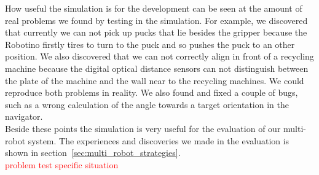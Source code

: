 How useful the simulation is for the development can be seen at the amount of real problems we found by testing in the simulation. For example, we discovered that currently we can not pick up pucks that lie besides the gripper because the Robotino firstly tires to turn to the puck and so pushes the puck to an other position. We also discovered that we can not correctly align in front of a recycling machine because the digital optical distance sensors can not distinguish between the plate of the machine and the wall near to the recycling machines. We could reproduce both problems in reality. We also found and fixed a couple of bugs, such as a wrong calculation of the angle towards a target orientation in the navigator.\\
Beside these points the simulation is very useful for the evaluation of our multi-robot system. The experiences and discoveries we made in the evaluation is shown in section~\ref{sec:multi_robot_strategies}.\\
\textcolor{red}{problem test specific situation}

